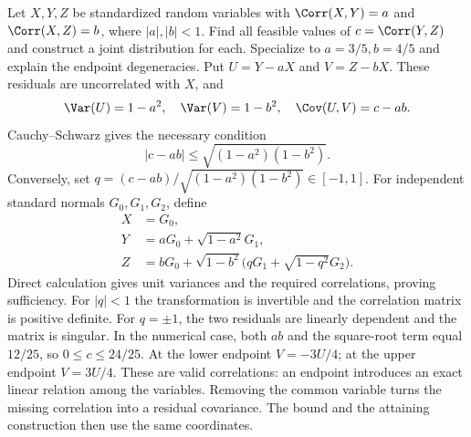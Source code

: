 Let $X,Y,Z$ be standardized random variables with $\Corr(X,Y)=a$ and $\Corr(X,Z)=b$, where $|a|,|b|<1$. Find all feasible values of $c=\Corr(Y,Z)$ and construct a joint distribution for each. Specialize to $a=3/5,b=4/5$ and explain the endpoint degeneracies.
\solution Put $U=Y-aX$ and $V=Z-bX$. These residuals are uncorrelated with $X$, and
\[
 \Var(U)=1-a^2,\quad\Var(V)=1-b^2,
 \quad\Cov(U,V)=c-ab.
\]
Cauchy--Schwarz gives the necessary condition
\[
 \boxed{|c-ab|\le\sqrt{(1-a^2)(1-b^2)}}.
\]
Conversely, set $q=(c-ab)/\sqrt{(1-a^2)(1-b^2)}\in[-1,1]$. For independent standard normals $G_0,G_1,G_2$, define
\[
 \begin{aligned}
 X&=G_0,\\
 Y&=aG_0+\sqrt{1-a^2}G_1,\\
 Z&=bG_0+\sqrt{1-b^2}\bigl(qG_1+\sqrt{1-q^2}G_2\bigr).
 \end{aligned}
\]
Direct calculation gives unit variances and the required correlations, proving sufficiency. For $|q|<1$ the transformation is invertible and the correlation matrix is positive definite. For $q=\pm1$, the two residuals are linearly dependent and the matrix is singular.
In the numerical case, both $ab$ and the square-root term equal $12/25$, so $0\le c\le24/25$. At the lower endpoint $V=-3U/4$; at the upper endpoint $V=3U/4$. These are valid correlations: an endpoint introduces an exact linear relation among the variables.
\insight Removing the common variable turns the missing correlation into a residual covariance. The bound and the attaining construction then use the same coordinates.
